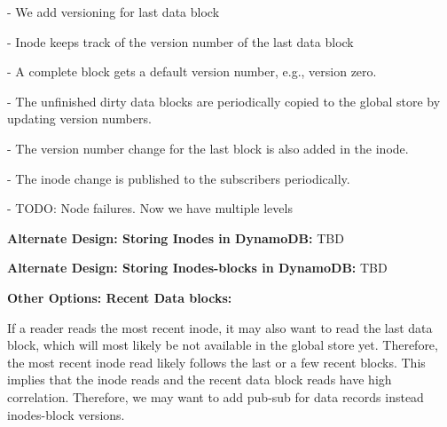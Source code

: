\documentclass[]{article}
\newcommand{\subtopic}[1]{\vspace{1.5pt} \noindent \textbf{#1}}
\begin{document}
- We add versioning for last data block

- Inode keeps track of the version number of the last data block

- A complete block gets a default version number, e.g., version zero.

- The unfinished dirty data blocks are periodically copied to the global store 
  by updating version numbers.

- The version number change for the last block is also added in the inode.

- The inode change is published to the subscribers periodically.


- TODO: Node failures. Now we have multiple levels 



%


\subtopic{Alternate Design: Storing Inodes in DynamoDB:} TBD


\subtopic{Alternate Design: Storing Inodes-blocks in DynamoDB:} TBD

\subtopic{Other Options: Recent Data blocks:}

If a reader reads the most recent inode, it may also want to read the last
data block, which will most likely be not available in the global store yet.
Therefore, the most recent inode read likely follows the last or a few recent
blocks. This implies that the inode reads and the recent data block reads have
high correlation. Therefore, we may want to add pub-sub for data records
instead inodes-block versions.
\end{document}
